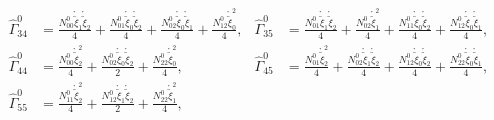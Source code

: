\begin{equation}
\begin{aligned}
\widehat{\Gamma}^{0}_{34} &= \frac{N^{0}_{00} \mathring{\widetilde{\xi}}_1 \mathring{\widetilde{\xi}}_2}{4} + \frac{N^{0}_{01} \mathring{\widetilde{\xi}}_0 \mathring{\widetilde{\xi}}_2}{4} + \frac{N^{0}_{02} \mathring{\widetilde{\xi}}_0 \mathring{\widetilde{\xi}}_1}{4} + \frac{N^{0}_{12} \mathring{\widetilde{\xi}}_0^{2}}{4}, & 
\widehat{\Gamma}^{0}_{35} &= \frac{N^{0}_{01} \mathring{\widetilde{\xi}}_1 \mathring{\widetilde{\xi}}_2}{4} + \frac{N^{0}_{02} \mathring{\widetilde{\xi}}_1^{2}}{4} + \frac{N^{0}_{11} \mathring{\widetilde{\xi}}_0 \mathring{\widetilde{\xi}}_2}{4} + \frac{N^{0}_{12} \mathring{\widetilde{\xi}}_0 \mathring{\widetilde{\xi}}_1}{4},\\[1ex]
\widehat{\Gamma}^{0}_{44} &= \frac{N^{0}_{00} \mathring{\widetilde{\xi}}_2^{2}}{4} + \frac{N^{0}_{02} \mathring{\widetilde{\xi}}_0 \mathring{\widetilde{\xi}}_2}{2} + \frac{N^{0}_{22} \mathring{\widetilde{\xi}}_0^{2}}{4}, & 
\widehat{\Gamma}^{0}_{45} &= \frac{N^{0}_{01} \mathring{\widetilde{\xi}}_2^{2}}{4} + \frac{N^{0}_{02} \mathring{\widetilde{\xi}}_1 \mathring{\widetilde{\xi}}_2}{4} + \frac{N^{0}_{12} \mathring{\widetilde{\xi}}_0 \mathring{\widetilde{\xi}}_2}{4} + \frac{N^{0}_{22} \mathring{\widetilde{\xi}}_0 \mathring{\widetilde{\xi}}_1}{4},\\[1ex]
\widehat{\Gamma}^{0}_{55} &= \frac{N^{0}_{11} \mathring{\widetilde{\xi}}_2^{2}}{4} + \frac{N^{0}_{12} \mathring{\widetilde{\xi}}_1 \mathring{\widetilde{\xi}}_2}{2} + \frac{N^{0}_{22} \mathring{\widetilde{\xi}}_1^{2}}{4}, & 
\end{aligned}\end{equation}

